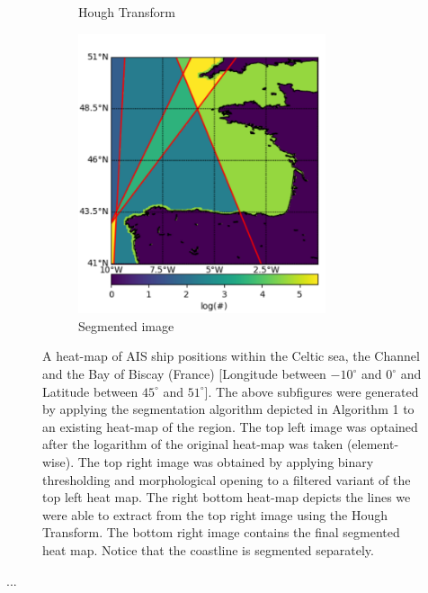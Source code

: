 \documentclass{article}
\begin{document}
\begin{figure}[h]
\begin{subfigure}[b]{0.5\linewidth}
    \caption{Hough Transform} 
    \label{fig7:c} 
  \end{subfigure}%
  \begin{subfigure}[b]{0.5\linewidth}
    \centering
    \includegraphics[width=0.8\textwidth]{CELTICsegmented-crop.pdf} 
    \caption{Segmented image} 
    \label{fig7:d} 
  \end{subfigure} 
  \caption{A heat-map of AIS ship positions within the Celtic sea, the Channel and the Bay of Biscay (France) [Longitude between $-10^{\circ}$ and $0^{\circ}$ and Latitude between $45^{\circ}$ and $51^{\circ}$]. The above subfigures were generated by applying the segmentation algorithm depicted in Algorithm 1 to an existing heat-map of the region. The top left image was optained after the logarithm of the original heat-map was taken (element-wise). The top right image 
  was obtained by applying binary thresholding and morphological opening to a filtered variant of the top left heat map. The right bottom heat-map depicts the lines we were able to extract 
  from the top right image using the Hough Transform. The bottom right image contains the final segmented heat map. Notice that the coastline is segmented separately.}
  \label{fig7} 
\end{figure}

...
\end{document}
